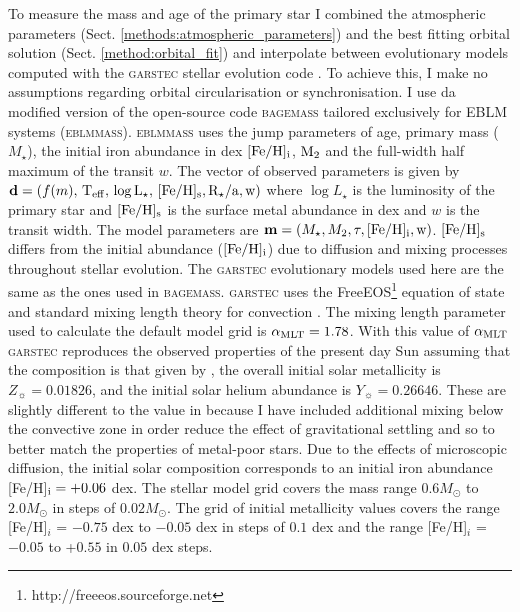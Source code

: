 To measure the mass and age of the primary star I combined the atmospheric parameters (Sect. \ref{methods:atmospheric_parameters}) and the best fitting orbital solution (Sect. \ref{method:orbital_fit}) and interpolate between evolutionary models computed with the \textsc{garstec} stellar evolution code \citep{2008Ap&SS.316...99W}. To achieve this, I make no assumptions regarding orbital circularisation or synchronisation. I use da modified version of the open-source code \textsc{bagemass} \citep{2015A&A...575A..36M} tailored exclusively for EBLM systems (\textsc{eblmmass}). \textsc{eblmmass} uses the jump parameters of age, primary mass ($M_{\star}$), the initial iron abundance in dex $\rm [Fe/H]_i$, $\rm M_2$ and the full-width half maximum of the transit $w$. The vector of  observed parameters is given by $\textbf{d} = (f(m),\,\rm T_{\rm eff}, \, \rm \log L_{\star}, \, \rm [Fe/H]_s, R_{\star}/a, w )$ where $\log L_{\star}$ is the luminosity of the primary star and $\rm [Fe/H]_s$ is the surface metal abundance in dex and $w$ is the transit width. The model parameters are $\textbf{m} = (M_{\star}, M_2, \tau, \rm [Fe/H]_i, w )$. $\rm [Fe/H]_s$ differs from the initial abundance ($\rm [Fe/H]_i$) due to diffusion and mixing processes throughout stellar evolution. The \textsc{garstec} evolutionary models used here are the same as the ones used in \textsc{bagemass}. \textsc{garstec} uses the FreeEOS\footnote{http://freeeos.sourceforge.net} equation of state \citep{2003ApJ...588..862C} and standard mixing length theory for convection \citep{1990sse..book.....K}. The mixing length parameter used to calculate the default model grid is $\alpha_{\rm MLT} = 1.78$. With this value of $\alpha_{\rm MLT}$ \textsc{garstec} reproduces the observed properties of the present day Sun assuming that the composition is that given by \citet{1998SSRv...85..161G}, the overall initial solar metallicity is $Z_{\sun} = 0.01826$, and the initial solar helium abundance is $Y_{\sun} = 0.26646$. These are slightly different to the value in \citet{2013PhRvD..87d3001S} because I have included additional mixing below the convective zone in order reduce the effect of gravitational settling and so to better match the properties of metal-poor stars. Due to the effects of microscopic diffusion, the initial solar composition corresponds to an initial iron abundance [Fe/H]$_{\rm i} = +0.06$ dex. The stellar model grid covers the mass range $0.6 M_{\odot}$ to $2.0 M_{\odot}$ in steps of $0.02 M_{\odot}$. The grid of initial metallicity values covers the range [Fe/H]$_i$ = $-0.75$ dex to $-0.05$ dex in steps of $0.1$ dex and the range [Fe/H]$_i$ = $-0.05$ to +$0.55$ in $0.05$ dex steps. 

